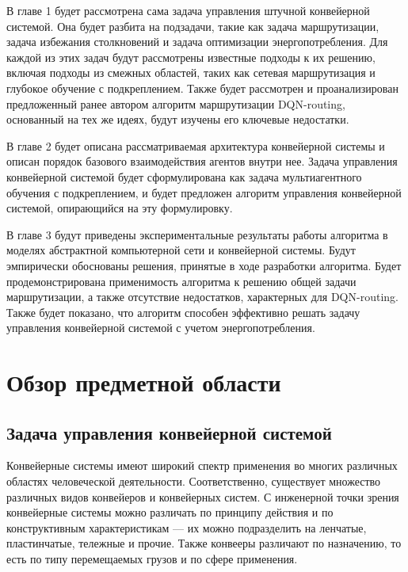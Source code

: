 \documentclass[specification,annotation,times]{itmo-student-thesis}
\theoremstyle{definition}
\begin{document}
В главе 1 будет рассмотрена сама задача управления штучной конвейерной системой.
Она будет разбита на подзадачи, такие как задача маршрутизации, задача
избежания столкновений и задача оптимизации энергопотребления. Для каждой из
этих задач будут рассмотрены известные подходы к их решению, включая подходы
из смежных областей, таких как сетевая маршрутизация и глубокое обучение с
подкреплением. Также будет рассмотрен и проанализирован предложенный ранее
автором алгоритм маршрутизации DQN-routing, основанный на тех же идеях, будут
изучены его ключевые недостатки.

В главе 2 будет описана рассматриваемая архитектура конвейерной системы и
описан порядок базового взаимодействия агентов внутри нее. Задача управления
конвейерной системой будет сформулирована как задача мультиагентного обучения с
подкреплением, и будет предложен алгоритм управления конвейерной системой,
опирающийся на эту формулировку.

В главе 3 будут приведены экспериментальные результаты работы алгоритма в
моделях абстрактной компьютерной сети и конвейерной системы. Будут
эмпирически обоснованы решения, принятые в ходе разработки алгоритма. Будет
продемонстрирована применимость алгоритма к решению общей задачи маршрутизации,
а также отсутствие недостатков, характерных для DQN-routing. Также будет
показано, что алгоритм способен эффективно решать задачу управления конвейерной
системой с учетом энергопотребления.

\chapter{Обзор предметной области}

\startrelatedwork

\section{Задача управления конвейерной системой}\label{problem-statement}

Конвейерные системы имеют широкий спектр применения во многих различных областях
человеческой деятельности. Соответственно, существует множество различных видов
конвейеров и конвейерных систем. С инженерной точки зрения конвейерные системы
можно различать по принципу действия и по конструктивным характеристикам
--- их можно подразделить на ленчатые, пластинчатые, тележные и прочие.
Также конвееры различают по назначению, то есть по типу перемещаемых грузов и по
сфере применения.
\end{document}
